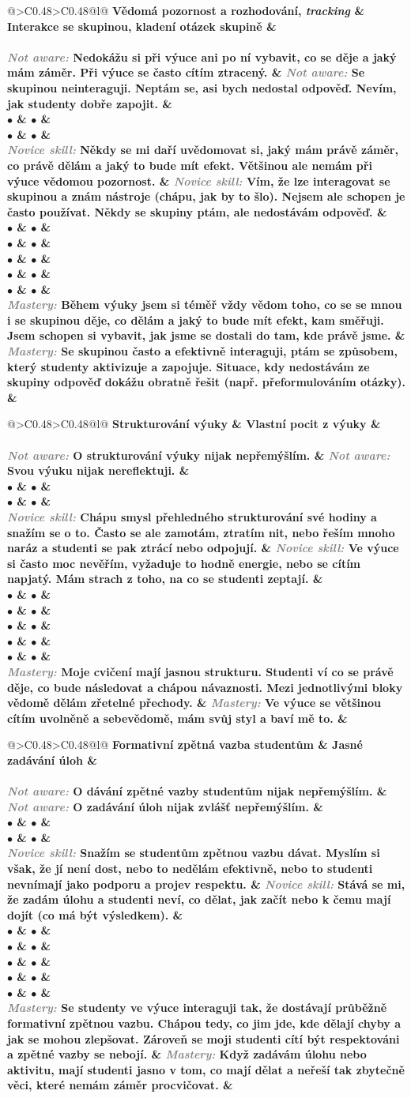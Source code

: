 \documentclass[twoside,openany,10pt]{book}
\makeatletter
\newcommand{\note}[1]{\textcolor{gray}{\small\itshape #1}}
\newcommand{\rubricpage}[8]{
\newpage
\begin{tabular}{@{}>{\small}C{0.48\textwidth}>{\small}C{0.48\textwidth}@{}l@{}}
\normalsize \bfseries #1 & \normalsize \bfseries #5 & \\[1em] \hline \\[-1.2em]
	\justify \note{Not aware:} #2 & \justify \note{Not aware:} #6 & \\[2em]
$\bullet$ & $\bullet$ & \\
$\bullet$ & $\bullet$ & \\
\justify \note{Novice skill:} #3 & \justify \note{Novice skill:} #7 & \\[3em]
$\bullet$ & $\bullet$ & \\
$\bullet$ & $\bullet$ & \\
$\bullet$ & $\bullet$ & \\
$\bullet$ & $\bullet$ & \\
$\bullet$ & $\bullet$ & \\
\justify \note{Mastery:} #4 & \justify \note{Mastery:} #8 &
\end{tabular}
}
\makeatother
\begin{document}
\newpage
\rubricpage{Vědomá pozornost a rozhodování, \textit{tracking}}
{Nedokážu si při výuce ani po ní vybavit, co se děje a jaký mám záměr. Při výuce se často cítím ztracený.}
{Někdy se mi daří uvědomovat si, jaký mám právě záměr, co právě dělám a jaký to bude mít efekt. Většinou ale nemám při výuce vědomou pozornost.}
{Během výuky jsem si téměř vždy vědom toho, co se se mnou i se skupinou děje, co dělám a jaký to bude mít efekt, kam směřuji. Jsem schopen si vybavit, jak jsme se dostali do tam, kde právě jsme.}
{Interakce se skupinou, kladení otázek skupině}
{Se skupinou neinteraguji. Neptám se, asi bych nedostal odpověď. Nevím, jak studenty dobře zapojit.}
{Vím, že lze interagovat se skupinou a znám nástroje (chápu, jak by to šlo). Nejsem ale schopen je často používat. Někdy  se skupiny ptám, ale nedostávám odpověď.}
{Se skupinou často a efektivně interaguji, ptám se způsobem, který studenty aktivizuje a zapojuje. Situace, kdy nedostávám ze skupiny odpověď dokážu obratně řešit (např. přeformulováním otázky).}

\rubricpage{Strukturování výuky}
{O strukturování výuky nijak nepřemýšlím.}
{Chápu smysl přehledného strukturování své hodiny a snažím se o to. Často se ale zamotám, ztratím nit, nebo řeším mnoho naráz a studenti se pak ztrácí nebo odpojují.}
{Moje cvičení mají jasnou strukturu. Studenti ví co se právě děje, co bude následovat a chápou návaznosti. Mezi jednotlivými bloky vědomě dělám zřetelné přechody.}
{Vlastní pocit z výuky}
{Svou výuku nijak nereflektuji.}
{Ve výuce si často moc nevěřím, vyžaduje to hodně energie, nebo se cítím napjatý. Mám strach z toho, na co se studenti zeptají.}
{Ve výuce se většinou cítím uvolněně a sebevědomě, mám svůj styl a baví mě to.}

\rubricpage{Formativní zpětná vazba studentům}
{O dávání zpětné vazby studentům nijak nepřemýšlím.}
{Snažím se studentům zpětnou vazbu dávat. Myslím si však, že jí není dost, nebo to nedělám efektivně, nebo to studenti nevnímají jako podporu a projev respektu.}
{Se studenty ve výuce interaguji tak, že dostávají průběžně formativní zpětnou vazbu. Chápou tedy, co jim jde, kde dělají chyby a jak se mohou zlepšovat. Zároveň se moji studenti cítí být respektováni a zpětné vazby se nebojí.}
{Jasné zadávání úloh}
{O zadávání úloh nijak zvlášť nepřemýšlím.}
{Stává se mi, že zadám úlohu a studenti neví, co dělat, jak začít nebo k čemu mají dojít (co má být výsledkem).}
{Když zadávám úlohu nebo aktivitu, mají studenti jasno v tom, co mají dělat a neřeší tak zbytečně věci, které nemám záměr procvičovat.}
\end{document}
